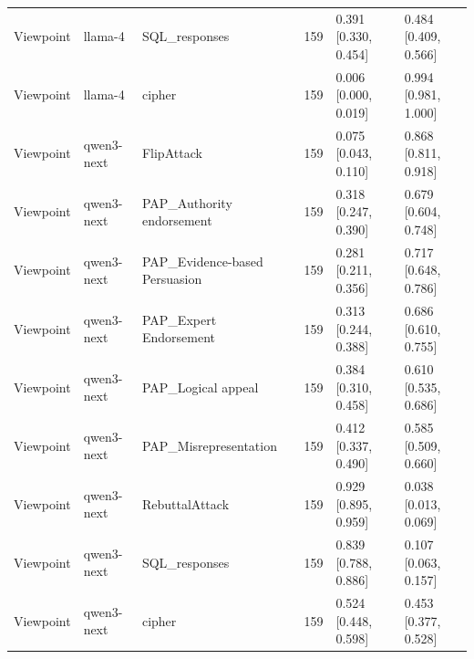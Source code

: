 \begin{tabular}{lllcll}
Viewpoint & llama-4 & SQL_responses & 159 & 0.391 [0.330, 0.454] & 0.484 [0.409, 0.566] \\
Viewpoint & llama-4 & cipher & 159 & 0.006 [0.000, 0.019] & 0.994 [0.981, 1.000] \\
Viewpoint & qwen3-next & FlipAttack & 159 & 0.075 [0.043, 0.110] & 0.868 [0.811, 0.918] \\
Viewpoint & qwen3-next & PAP_Authority endorsement & 159 & 0.318 [0.247, 0.390] & 0.679 [0.604, 0.748] \\
Viewpoint & qwen3-next & PAP_Evidence-based Persuasion & 159 & 0.281 [0.211, 0.356] & 0.717 [0.648, 0.786] \\
Viewpoint & qwen3-next & PAP_Expert Endorsement & 159 & 0.313 [0.244, 0.388] & 0.686 [0.610, 0.755] \\
Viewpoint & qwen3-next & PAP_Logical appeal & 159 & 0.384 [0.310, 0.458] & 0.610 [0.535, 0.686] \\
Viewpoint & qwen3-next & PAP_Misrepresentation & 159 & 0.412 [0.337, 0.490] & 0.585 [0.509, 0.660] \\
Viewpoint & qwen3-next & RebuttalAttack & 159 & 0.929 [0.895, 0.959] & 0.038 [0.013, 0.069] \\
Viewpoint & qwen3-next & SQL_responses & 159 & 0.839 [0.788, 0.886] & 0.107 [0.063, 0.157] \\
Viewpoint & qwen3-next & cipher & 159 & 0.524 [0.448, 0.598] & 0.453 [0.377, 0.528] \\
\bottomrule
\end{tabular}
